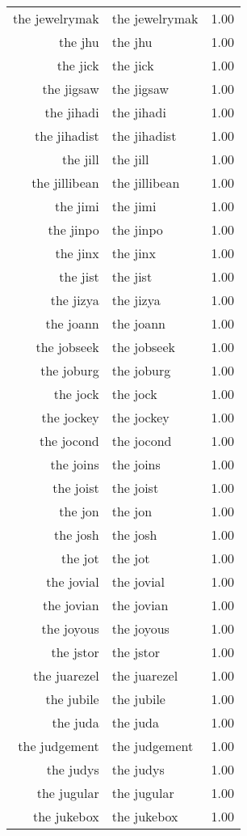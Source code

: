\begin{table}[ht]
\begin{tabular}{rlr}
  the jewelrymak & the jewelrymak & 1.00 \\ 
  the jhu & the jhu & 1.00 \\ 
  the jick & the jick & 1.00 \\ 
  the jigsaw & the jigsaw & 1.00 \\ 
  the jihadi & the jihadi & 1.00 \\ 
  the jihadist & the jihadist & 1.00 \\ 
  the jill & the jill & 1.00 \\ 
  the jillibean & the jillibean & 1.00 \\ 
  the jimi & the jimi & 1.00 \\ 
  the jinpo & the jinpo & 1.00 \\ 
  the jinx & the jinx & 1.00 \\ 
  the jist & the jist & 1.00 \\ 
  the jizya & the jizya & 1.00 \\ 
  the joann & the joann & 1.00 \\ 
  the jobseek & the jobseek & 1.00 \\ 
  the joburg & the joburg & 1.00 \\ 
  the jock & the jock & 1.00 \\ 
  the jockey & the jockey & 1.00 \\ 
  the jocond & the jocond & 1.00 \\ 
  the joins & the joins & 1.00 \\ 
  the joist & the joist & 1.00 \\ 
  the jon & the jon & 1.00 \\ 
  the josh & the josh & 1.00 \\ 
  the jot & the jot & 1.00 \\ 
  the jovial & the jovial & 1.00 \\ 
  the jovian & the jovian & 1.00 \\ 
  the joyous & the joyous & 1.00 \\ 
  the jstor & the jstor & 1.00 \\ 
  the juarezel & the juarezel & 1.00 \\ 
  the jubile & the jubile & 1.00 \\ 
  the juda & the juda & 1.00 \\ 
  the judgement & the judgement & 1.00 \\ 
  the judys & the judys & 1.00 \\ 
  the jugular & the jugular & 1.00 \\ 
  the jukebox & the jukebox & 1.00 \\ 

\end{tabular}
\end{table}
